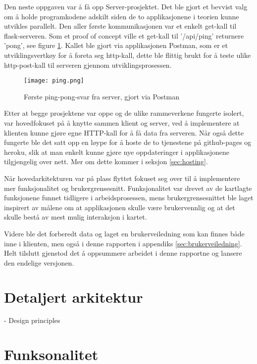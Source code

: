 Den neste oppgaven var å få opp Server-prosjektet. Det ble gjort et bevvist valg om å holde programkodene adskilt siden de to applikasjonene i teorien kunne utvikles parallelt. Den aller første kommunikasjonen var et enkelt get-kall til flask-serveren. Som et proof of concept ville et get-kall til '/api/ping' returnere 'pong', see figure \ref{fig:firstping}. Kallet ble gjort via applikasjonen Postman, som er et utviklingsvertkøy for å foreta seg http-kall, dette ble flittig brukt for å teste ulike http-post-kall til serveren gjennom utviklingsprosessen.  

\begin{figure}[h]
    \center
    \texttt{[image: ping.png]}
    \caption{Første ping-pong-svar fra server, gjort via Postman}
    \label{fig:firstping}
\end{figure}

Etter at begge prosjektene var oppe og de ulike rammeverkene fungerte isolert, var hovedfokuset på å knytte sammen klient og server, ved å implementere at klienten kunne gjøre egne HTTP-kall for å få data fra serveren. Når også dette fungerte ble det satt opp en løype for å hoste de to tjenestene på github-pages og heroku, slik at man enkelt kunne gjøre nye oppdateringer i applikasjonene tilgjengelig over nett. Mer om dette kommer i seksjon \ref{sec:hosting}.

Når hovedarkitekturen var på plass flyttet fokuset seg over til å implementere mer funksjonalitet og brukergrensesnitt. Funksjonalitet var drevet av de kartlagte funksjonene funnet tidligere i arbeidsprosessen, mens brukergrensesnittet ble laget inspirert av målene om at applikasjonen skulle være brukervennlig og at det skulle bestå av mest mulig interaksjon i kartet. 

Videre ble det forberedt data og laget en brukerveiledning som kan finnes både inne i klienten, men også i denne rapporten i appendiks \ref{sec:brukerveiledning}. Helt tilslutt gjenstod det å oppsummere arbeidet i denne rapportne og lansere den endelige versjonen. 

\section{Detaljert arkitektur}

- Design principles

\section{Funksonalitet}

